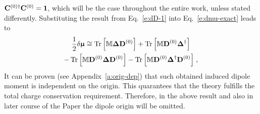 \documentclass[aip,amsmath,amssymb,reprint]{revtex4-1}
\newcommand{\BM}[1]{\bm{#1}}
\DeclareMathOperator{\Tr}{Tr}
\begin{document}
${\bf C}^{(0)\dagger}{\bf C}^{(0)}={\bf 1}$,
which will be the case throughout the entire work, unless stated differently.
Substituting the result from Eq.~\eqref{e:dD-1}
into Eq.~\eqref{e:dmu-exact} leads to
%
\begin{multline} \label{e:dmu-4-exact.linear-approximation}
 \frac{1}{2} 
 \delta {\BM{\upmu}}
  \cong
   \Tr{ 
    \left[ 
         {\mathbb{M}} {\BM\Delta} {\bf D}^{(0)}  
    \right] }
%
  +\Tr{ 
    \left[ 
         {\mathbb{M}} {\bf D}^{(0)} {\BM\Delta}^{\dagger}
    \right] } \\
%
  -\Tr{ 
    \left[ 
         {\mathbb{M}} {\bf D}^{(0)} {\BM\Delta} {\bf D}^{(0)}
    \right] }
%
  -\Tr{ 
    \left[ 
         {\mathbb{M}} {\bf D}^{(0)} {\BM\Delta}^{\dagger} {\bf D}^{(0)}
    \right] } \;,
\end{multline}
%
It can be proven (see Appendix~\ref{a:orig-dep}) that such obtained
induced dipole moment is independent on the origin. 
This quarantees that the theory fulfills the total charge conservation requirement.
Therefore,
in the above result and also in later course of the Paper the dipole origin will be omitted. 
\end{document}

